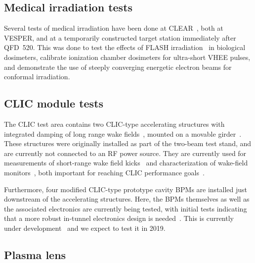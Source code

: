 \documentclass[a4paper,
               keeplastbox,   %
               ]{jacow}
\begin{document}
\subsection{Medical irradiation tests}
Several tests of medical irradiation have been done at CLEAR~\cite{Wilfrid::CLEARrev}, both at VESPER, and at a temporarily constructed target station immediately after QFD~520.
This was done to test the effects of FLASH irradiation~\cite{FLASH2017} in biological dosimeters, calibrate ionization chamber dosimeters for ultra-short VHEE pulses, and demonstrate the use of steeply converging energetic electron beams for conformal irradiation.

\subsection{CLIC module tests}
The CLIC test area contains two CLIC-type accelerating structures with integrated damping of long range wake fields~\cite{Grudiev:TD26}, mounted on a movable girder~\cite{Durand-mover::AccelAlign12,Sosin-mover::IPAC12}.
These structures were originally installed as part of the two-beam test stand, and are currently not connected to an RF power source.
They are currently used for measurements of short-range wake field kicks~\cite{Antonio::IEEE-Kicks} and characterization of wake-field monitors~\cite{KyrreSjobak::CLICWS19}, both important for reaching CLIC performance goals~\cite{CLIC-CDR,CLIC-PIP}.


Furthermore, four modified CLIC-type prototype cavity BPMs are installed just downstream of the accelerating structures.
Here, the BPMs themselves as well as the associated electronics are currently being tested, with initial tests indicating that a more robust in-tunnel electronics design is needed~\cite{NadenauThesis}.
This is currently under development~\cite{AlexejLyapin::CLICWS19} and we expect to test it in 2019.

\subsection{Plasma lens}
\end{document}
